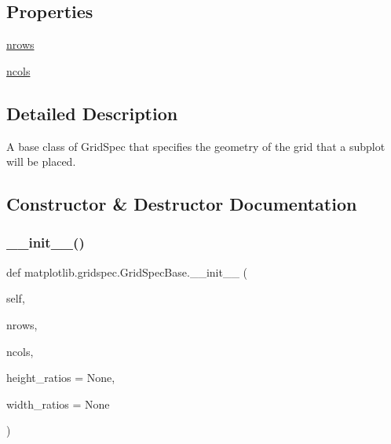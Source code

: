 \subsection*{Properties}
\begin{DoxyCompactItemize}
\item 
\hyperlink{classmatplotlib_1_1gridspec_1_1GridSpecBase_a610c62c29d638e1ed969419091c97f74}{nrows}
\item 
\hyperlink{classmatplotlib_1_1gridspec_1_1GridSpecBase_ad86cfae5903f2bf4e2fc878fd39461f3}{ncols}
\end{DoxyCompactItemize}


\subsection{Detailed Description}
\begin{DoxyVerb}A base class of GridSpec that specifies the geometry of the grid
that a subplot will be placed.
\end{DoxyVerb}
 

\subsection{Constructor \& Destructor Documentation}
\mbox{\label{classmatplotlib_1_1gridspec_1_1GridSpecBase_aa7323731118c46021bffc09f83b9d12e}} 
\subsubsection{\texorpdfstring{\+\_\+\+\_\+init\+\_\+\+\_\+()}{\_\_init\_\_()}}
{\footnotesize\ttfamily def matplotlib.\+gridspec.\+Grid\+Spec\+Base.\+\_\+\+\_\+init\+\_\+\+\_\+ (\begin{DoxyParamCaption}\item[{}]{self,  }\item[{}]{nrows,  }\item[{}]{ncols,  }\item[{}]{height\+\_\+ratios = {\ttfamily None},  }\item[{}]{width\+\_\+ratios = {\ttfamily None} }\end{DoxyParamCaption})}

